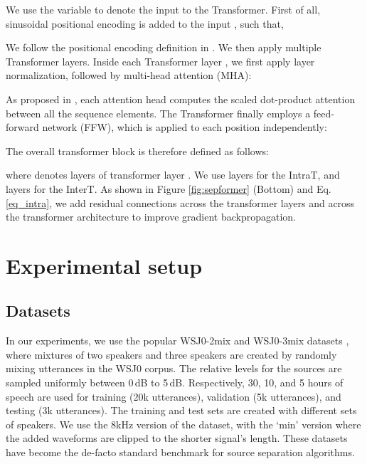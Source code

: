\documentclass[lettersize,journal]{IEEEtran}
\begin{document}
We use the variable  to denote the input to the Transformer. First of all, sinusoidal positional encoding  is added to the input , such that, 

We follow the positional encoding definition in \cite{vaswani2017}. 
We then apply multiple Transformer layers. 
Inside each Transformer layer , we first apply layer normalization, followed by multi-head attention (MHA):

As proposed in \cite{vaswani2017}, each attention head computes the scaled dot-product attention between all the sequence elements.
The Transformer finally employs a feed-forward network (FFW), which is applied to each position independently:

The overall transformer block is therefore defined as follows:

where  denotes  layers of transformer layer . We use  layers for the IntraT, and  layers for the InterT.
As shown in Figure \ref{fig:sepformer} (Bottom) and Eq. \eqref{eq_intra}, we add residual connections across the transformer layers and across the transformer architecture to improve gradient backpropagation. 




\section{Experimental setup}
\label{sec:experiments}



\subsection{Datasets} 
In our experiments, we use the popular WSJ0-2mix and WSJ0-3mix datasets \cite{hershey2015deep}, where mixtures of two speakers and three speakers are created by randomly mixing utterances in the WSJ0 corpus. The relative levels for the sources are sampled uniformly between 0\,dB to 5\,dB. Respectively, 30, 10, and 5 hours of speech are used for training (20k utterances), validation (5k utterances), and testing (3k utterances). The training and test sets are created with different sets of speakers. We use the 8kHz version of the dataset, with the `min' version where the added waveforms are clipped to the shorter signal's length. These datasets have become the de-facto standard benchmark for source separation algorithms.
\end{document}
